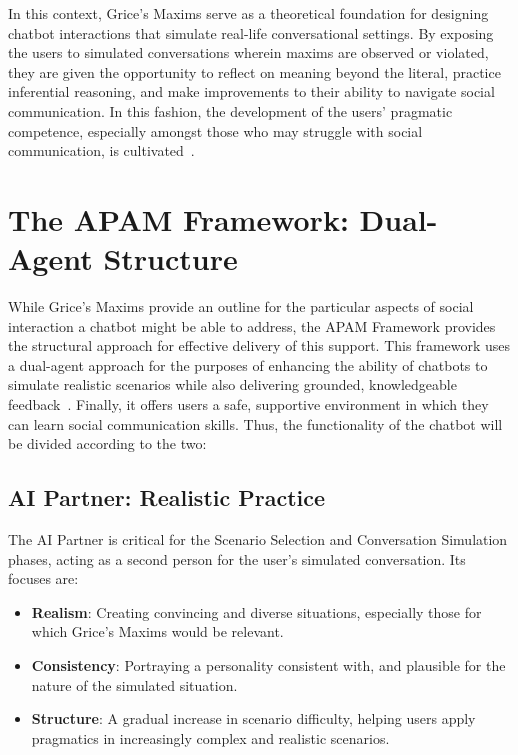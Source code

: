 In this context, Grice's Maxims serve as a theoretical foundation for designing chatbot interactions that simulate real-life conversational settings. By exposing the users to simulated conversations wherein maxims are observed or violated, they are given the opportunity to reflect on meaning beyond the literal, practice inferential reasoning, and make improvements to their ability to navigate social communication. In this fashion, the development of the users' pragmatic competence, especially amongst those who may struggle with social communication, is cultivated~\cite{yang_social_2024}.



\section{The APAM Framework: Dual-Agent Structure}

While Grice's Maxims provide an outline for the particular aspects of social interaction a chatbot might be able to address, the APAM Framework provides the structural approach for effective delivery of this support. This framework uses a dual-agent approach for the purposes of enhancing the ability of chatbots to simulate realistic scenarios while also delivering grounded, knowledgeable feedback~\cite{yang_social_2024}. Finally, it offers users a safe, supportive environment in which they can learn social communication skills. Thus, the functionality of the chatbot will be divided according to the two:

\subsection{AI Partner: Realistic Practice}

The AI Partner is critical for the Scenario Selection and Conversation Simulation phases, acting as a second person for the user's simulated conversation. Its focuses are:

\begin{itemize}
    \item \textbf{Realism}: Creating convincing and diverse situations, especially those for which Grice's Maxims would be relevant.
    \item \textbf{Consistency}: Portraying a personality consistent with, and plausible for the nature of the simulated situation.
    \item \textbf{Structure}: A gradual increase in scenario difficulty, helping users apply pragmatics in increasingly complex and realistic scenarios.
\end{itemize}

